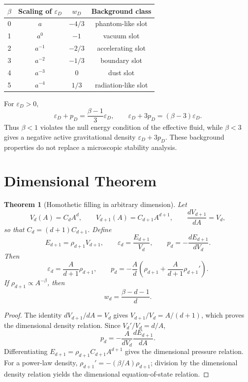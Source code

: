 \documentclass[11pt,a4paper]{article}
\def\dd{d}%
\numberwithin{equation}{section}
\theoremstyle{definition}
\theoremstyle{plain}
\newtheorem{theorem}[criterion]{Theorem}
\theoremstyle{remark}
\newcommand{\epsD}{\varepsilon_D}
\newcommand{\pD}{p_D}
\newcommand{\dd}{\mathrm{d}}
\begin{document}
\begin{center}
\begin{tabular}{@{}cccc@{}}
\toprule
\(\beta\) & Scaling of \(\epsD\) & \(w_D\) & Background class \\
\midrule
0 & \(a\)      & \(-4/3\) & phantom-like slot \\
1 & \(a^0\)    & \(-1\)   & vacuum slot \\
2 & \(a^{-1}\) & \(-2/3\) & accelerating slot \\
3 & \(a^{-2}\) & \(-1/3\) & boundary slot \\
4 & \(a^{-3}\) & \(0\)    & dust slot \\
5 & \(a^{-4}\) & \(1/3\)  & radiation-like slot \\
\bottomrule
\end{tabular}
\end{center}

For \(\epsD>0\),
\begin{equation}
\epsD+
\pD=\frac{\beta-1}{3}\epsD,
\qquad
\epsD+3\pD=(\beta-3)\epsD.
\end{equation}
Thus \(\beta<1\) violates the null energy condition of the effective fluid, while \(\beta<3\) gives a negative active gravitational density \(\epsD+3\pD\). These background properties do not replace a microscopic stability analysis.

\section{Dimensional Theorem}
\begin{theorem}[Homothetic filling in arbitrary dimension]
Let
\begin{equation}
V_d(A)=C_dA^d,
\qquad
V_{d+1}(A)=C_{d+1}A^{d+1},
\qquad
\frac{\dd V_{d+1}}{\dd A}=V_d,
\end{equation}
so that \(C_d=(d+1)C_{d+1}\). Define
\begin{equation}
E_{d+1}=\rho_{d+1}V_{d+1},
\qquad
\varepsilon_d=\frac{E_{d+1}}{V_d},
\qquad
p_d=-\frac{\dd E_{d+1}}{\dd V_d}.
\end{equation}
Then
\begin{equation}
\varepsilon_d=\frac{A}{d+1}\rho_{d+1},
\qquad
p_d=-\frac{A}{d}\left(\rho_{d+1}+\frac{A}{d+1}\rho_{d+1}'\right).
\end{equation}
If \(\rho_{d+1}\propto A^{-\beta}\), then
\begin{equation}
w_d=\frac{\beta-d-1}{d}.
\end{equation}
\end{theorem}
\begin{proof}
The identity \(\dd V_{d+1}/\dd A=V_d\) gives \(V_{d+1}/V_d=A/(d+1)\), which proves the dimensional density relation. Since \(V_d'/V_d=d/A\),
\begin{equation}
p_d=-\frac{A}{dV_d}\frac{\dd E_{d+1}}{\dd A}.
\end{equation}
Differentiating \(E_{d+1}=\rho_{d+1}C_{d+1}A^{d+1}\) gives the dimensional pressure relation. For a power-law density, \(\rho_{d+1}'=-(\beta/A)\rho_{d+1}\); division by the dimensional density relation yields the dimensional equation-of-state relation.
\end{proof}
\end{document}
